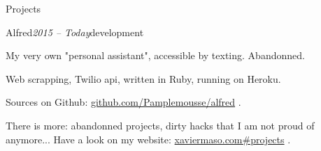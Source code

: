 \begin{rSection}{Projects}
  \begin{rSubsection}{Alfred}{\em 2015 -- Today}{development}{}
    \item[] My very own "personal assistant", accessible by texting. Abandonned.
    \item Web scrapping, Twilio api, written in Ruby, running on Heroku.
    \item Sources on Github: \href{https://github.com/Pamplemousse/alfred}{github.com/Pamplemousse/alfred} .
  \end{rSubsection}

  \begin{rSubsection}{}{}{}{}
  \item[] There is more: abandonned projects, dirty hacks that I am not proud of anymore... Have a look on my website: \href{http://xaviermaso.com#projects}{xaviermaso.com\#projects} .
  \end{rSubsection}

\end{rSection}

